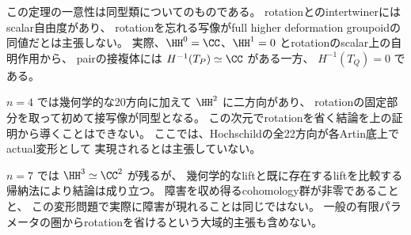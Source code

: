 \begin{remark}\label{rem:unpolarized-scope}
 この定理の一意性は同型類についてのものである。
 rotationとのintertwinerにはscalar自由度があり、
 rotationを忘れる写像がfull higher deformation groupoidの同値だとは主張しない。
 実際、\(\HH^0=\CC\)、\(\HH^1=0\) とrotationのscalar上の自明作用から、
 pairの接複体には \(H^{-1}(T_P)\simeq\CC\) がある一方、
 \(H^{-1}(T_Q)=0\) である。

 \(n=4\) では幾何学的な20方向に加えて \(\HH^2\) に二方向があり、
 rotationの固定部分を取って初めて接写像が同型となる。
 この次元でrotationを省く結論を上の証明から導くことはできない。
 ここでは、Hochschildの全22方向が各Artin底上でactual変形として
 実現されるとは主張していない。

 \(n=7\) では \(\HH^3\simeq\CC^2\) が残るが、
 幾何学的なliftと既に存在するliftを比較する帰納法により結論は成り立つ。
 障害を収め得るcohomology群が非零であることと、
 この変形問題で実際に障害が現れることは同じではない。
 一般の有限パラメータの圏からrotationを省けるという大域的主張も含めない。
\end{remark}

